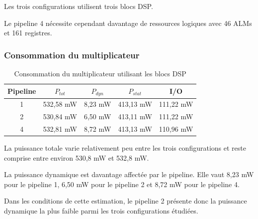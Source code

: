 \documentclass[12pt,a4paper]{article}
\begin{document}
Les trois configurations utilisent trois blocs DSP.

Le pipeline 4 nécessite cependant davantage de ressources logiques
avec 46 ALMs et 161 registres.



\subsubsection{Consommation du multiplicateur}

\begin{table}[H]
    \centering

    \caption{Consommation du multiplicateur utilisant les blocs DSP}

    \begin{tabular}{ccccc}
        \toprule

        \textbf{Pipeline} &
        \textbf{$P_{tot}$} &
        \textbf{$P_{dyn}$} &
        \textbf{$P_{stat}$} &
        \textbf{I/O} \\

        \midrule

        1 &
        532,58 mW &
        8,23 mW &
        413,13 mW &
        111,22 mW \\

        2 &
        530,84 mW &
        6,50 mW &
        413,11 mW &
        111,22 mW \\

        4 &
        532,81 mW &
        8,72 mW &
        413,13 mW &
        110,96 mW \\

        \bottomrule
    \end{tabular}
\end{table}

La puissance totale varie relativement peu entre les trois
configurations et reste comprise entre environ 530,8 mW et
532,8 mW.

La puissance dynamique est davantage affectée par le pipeline.
Elle vaut 8,23 mW pour le pipeline 1, 6,50 mW pour le pipeline 2
et 8,72 mW pour le pipeline 4.

Dans les conditions de cette estimation, le pipeline 2 présente
donc la puissance dynamique la plus faible parmi les trois
configurations étudiées.


\end{document}
